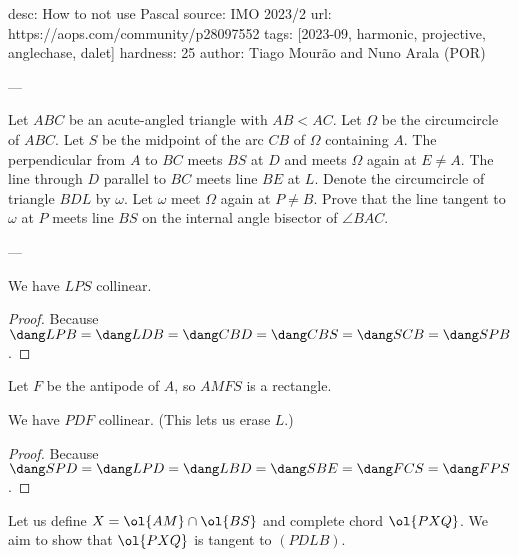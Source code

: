 desc: How to not use Pascal
source: IMO 2023/2
url: https://aops.com/community/p28097552
tags: [2023-09, harmonic, projective, anglechase, dalet]
hardness: 25
author: Tiago Mourão and Nuno Arala (POR)

---

Let $ABC$ be an acute-angled triangle with $AB < AC$.
Let $\Omega$ be the circumcircle of $ABC$.
Let $S$ be the midpoint of the arc $CB$ of $\Omega$ containing $A$.
The perpendicular from $A$ to $BC$ meets $BS$ at $D$ and meets $\Omega$ again at $E \neq A$.
The line through $D$ parallel to $BC$ meets line $BE$ at $L$.
Denote the circumcircle of triangle $BDL$ by $\omega$.
Let $\omega$ meet $\Omega$ again at $P \neq B$.
Prove that the line tangent to $\omega$ at $P$ meets line $BS$
on the internal angle bisector of $\angle BAC$.

---

\begin{claim*}
  We have $LPS$ collinear.
\end{claim*}
\begin{proof}
  Because $\dang LPB = \dang LDB = \dang CBD = \dang CBS = \dang SCB = \dang SPB$.
\end{proof}

Let $F$ be the antipode of $A$, so $AMFS$ is a rectangle.
\begin{claim*}
  We have $PDF$ collinear. (This lets us erase $L$.)
\end{claim*}
\begin{proof}
   Because $\dang SPD = \dang LPD = \dang LBD = \dang SBE = \dang FCS = \dang FPS$.
\end{proof}

Let us define $X = \ol{AM} \cap \ol{BS}$ and complete chord $\ol{PXQ}$.
We aim to show that $\ol{PXQ}$ is tangent to $(PDLB)$.

